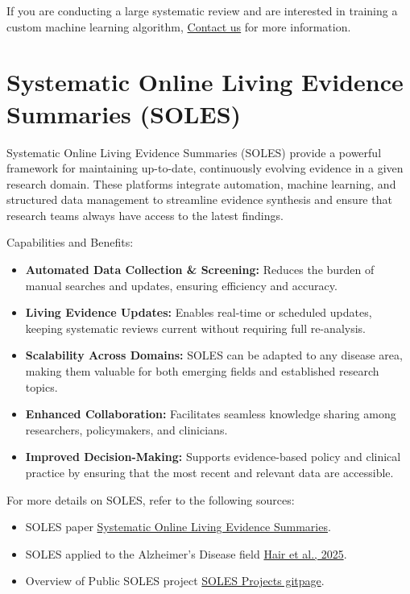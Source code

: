 \documentclass[
]{book}
\begin{document}
If you are conducting a large systematic review and are interested in training a custom machine learning algorithm, \href{mailto:camarades.berlin@charite.de}{Contact us} for more information.

\section{Systematic Online Living Evidence Summaries (SOLES)}\label{systematic-online-living-evidence-summaries-soles}

Systematic Online Living Evidence Summaries (SOLES) provide a powerful framework for maintaining up-to-date, continuously evolving evidence in a given research domain. These platforms integrate automation, machine learning, and structured data management to streamline evidence synthesis and ensure that research teams always have access to the latest findings.

Capabilities and Benefits:

\begin{itemize}
\item
  \textbf{Automated Data Collection \& Screening:} Reduces the burden of manual searches and updates, ensuring efficiency and accuracy.
\item
  \textbf{Living Evidence Updates:} Enables real-time or scheduled updates, keeping systematic reviews current without requiring full re-analysis.
\item
  \textbf{Scalability Across Domains:} SOLES can be adapted to any disease area, making them valuable for both emerging fields and established research topics.
\item
  \textbf{Enhanced Collaboration:} Facilitates seamless knowledge sharing among researchers, policymakers, and clinicians.
\item
  \textbf{Improved Decision-Making:} Supports evidence-based policy and clinical practice by ensuring that the most recent and relevant data are accessible.
\end{itemize}

For more details on SOLES, refer to the following sources:

\begin{itemize}
\item
  SOLES paper \href{https://portlandpress.com/clinsci/article/137/10/773/233083/Systematic-online-living-evidence-summaries}{Systematic Online Living Evidence Summaries}.
\item
  SOLES applied to the Alzheimer's Disease field \href{https://www.sciencedirect.com/science/article/pii/S0165027024001547}{Hair et al., 2025}.
\item
  Overview of Public SOLES project \href{https://camaradesuk.github.io/soles-projects/}{SOLES Projects gitpage}.
\end{itemize}
\end{document}
